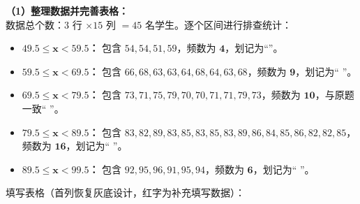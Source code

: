 \textbf{（1）整理数据并完善表格：} \\
数据总个数：$3$ 行 $\times 15$ 列 $= 45$ 名学生。逐个区间进行排查统计：
\begin{itemize}
  \item \textbf{$\boldsymbol{49.5 \leqslant x < 59.5}$：} 包含 $54, 54, 51, 59$，频数为 $\boldsymbol{4}$，划记为“\zhengIV{}”。
  \item \textbf{$\boldsymbol{59.5 \leqslant x < 69.5}$：} 包含 $66, 68, 63, 63, 64, 68, 64, 63, 68$，频数为 $\boldsymbol{9}$，划记为“\zhengV{} \zhengIV{}”。
  \item \textbf{$\boldsymbol{69.5 \leqslant x < 79.5}$：} 包含 $73, 71, 75, 79, 70, 70, 71, 71, 79, 73$，频数为 $\boldsymbol{10}$，与原题一致“\zhengV{} \zhengV{}”。
  \item \textbf{$\boldsymbol{79.5 \leqslant x < 89.5}$：} 包含 $83, 82, 89, 83, 85, 83, 85, 83, 89, 86, 84, 85, 86, 82, 82, 85$，频数为 $\boldsymbol{16}$，划记为“\zhengV{} \zhengV{} \zhengV{} \zhengI{}”。
  \item \textbf{$\boldsymbol{89.5 \leqslant x < 99.5}$：} 包含 $92, 95, 96, 91, 95, 94$，频数为 $\boldsymbol{6}$，划记为“\zhengV{} \zhengI{}”。
\end{itemize}

填写表格（首列恢复灰底设计，红字为补充填写数据）：

\vspace{0.4cm}

\begin{center}
\renewcommand{\arraystretch}{1.6}
\end{center}


